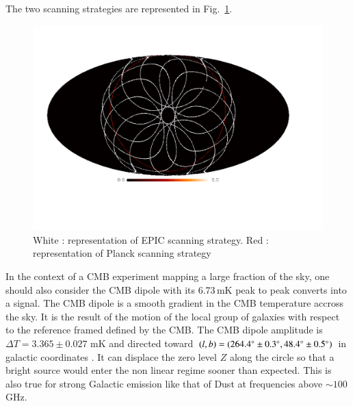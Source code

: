 The two scanning strategies are represented in Fig.~\ref{fig:strat-polsat-Planck}.

\begin{figure}[h]
  \includegraphics[clip,angle=0,width=\columnwidth]{Figures/plot_mollweide.pdf}
  \caption{White : representation of EPIC scanning strategy. Red : representation of Planck scanning strategy }
  \label{fig:strat-polsat-Planck}
\end{figure}

In the context of a CMB experiment mapping a large fraction of the sky, one should also consider the CMB dipole  with its 6.73\,mK peak to peak \citep{2015IJMPD..2430004B} converts into a  signal. The CMB dipole is a smooth gradient in the CMB temperature accross the sky. It is the result of the motion of the local group of galaxies with respect to the reference framed defined by the CMB. The CMB dipole amplitude is $\Delta T = 3.365 \pm 0.027$ mK and directed toward $(l,b) = (264.4 \degree \pm 0.3 \degree , 48.4 \degree \pm 0.5 \degree)$ in galactic coordinates \citep{1993ApJ...419....1K}. It can displace the zero level $Z$ along the circle so that a bright source would enter the non linear regime sooner than expected. This is also true for strong Galactic emission like that of Dust at frequencies above $\sim 100$\,GHz. 


